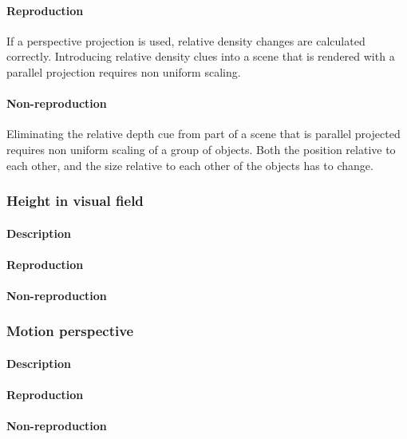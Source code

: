 \paragraph{Reproduction}
If a perspective projection is used, relative density changes are calculated correctly. Introducing relative density clues into a scene that is rendered with a parallel projection requires non uniform scaling.

\paragraph{Non-reproduction}
Eliminating the relative depth cue from part of a scene that is parallel projected requires non uniform scaling of a group of objects. Both the position relative to each other, and the size relative to each other of the objects has to change.


\subsubsection{Height in visual field}
\paragraph{Description}


\paragraph{Reproduction}

\paragraph{Non-reproduction}


\subsubsection{Motion perspective}
\paragraph{Description}

\paragraph{Reproduction}

\paragraph{Non-reproduction}


